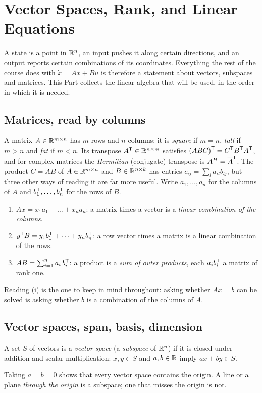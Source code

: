 \documentclass[11pt]{article}
\begin{document}


\section{Vector Spaces, Rank, and Linear Equations}\label{sec:vspace}

A state is a point in $\mathbb{R}^{n}$, an input pushes it along certain directions, and an
output reports certain combinations of its coordinates. Everything the rest of the
course does with $\dot x=Ax+Bu$ is therefore a statement about vectors, subspaces
and matrices. This Part collects the linear algebra that will be used, in the
order in which it is needed.

\subsection{Matrices, read by columns}
A matrix $A\in\mathbb{R}^{m\times n}$ has $m$ rows and $n$ columns; it is \emph{square} if
$m=n$, \emph{tall} if $m>n$ and \emph{fat} if $m<n$. Its transpose $A^{\mathsf{T}}\in\mathbb{R}^{n\times m}$
satisfies $(ABC)^{\mathsf{T}}=C^{\mathsf{T}} B^{\mathsf{T}} A^{\mathsf{T}}$, and for complex matrices the
\emph{Hermitian} (conjugate) transpose is $A^{H}=\overline{A}^{\mathsf{T}}$. The product
$C=AB$ of $A\in\mathbb{R}^{m\times n}$ and $B\in\mathbb{R}^{n\times k}$ has entries
$c_{ij}=\sum_{l}a_{il}b_{lj}$, but three other ways of reading it are far more
useful. Write $a_1,\dots,a_n$ for the columns of $A$ and $b_1^{\mathsf{T}},\dots,b_n^{\mathsf{T}}$ for
the rows of $B$.
\begin{enumerate}[label=(\roman*),itemsep=2pt]
\item $Ax = x_1a_1+\dots+x_na_n$: a matrix times a vector is a
\emph{linear combination of the columns}.
\item $y^{\mathsf{T}} B = y_1b_1^{\mathsf{T}}+\dots+y_nb_n^{\mathsf{T}}$: a row vector times a matrix is a linear
combination of the rows.
\item $AB = \sum_{i=1}^{n} a_i\,b_i^{\mathsf{T}}$: a product is a \emph{sum of outer products},
each $a_ib_i^{\mathsf{T}}$ a matrix of rank one.
\end{enumerate}
Reading (i) is the one to keep in mind throughout: asking whether $Ax=b$ can be
solved is asking whether $b$ is a combination of the columns of $A$.

\subsection{Vector spaces, span, basis, dimension}
\begin{definition}
A set $S$ of vectors is a \emph{vector space} (a \emph{subspace} of $\mathbb{R}^{n}$) if
it is closed under addition and scalar multiplication: $x,y\in S$ and
$a,b\in\mathbb{R}$ imply $ax+by\in S$.
\end{definition}
Taking $a=b=0$ shows that every vector space contains the origin. A line or a plane
\emph{through the origin} is a subspace; one that misses the origin is not.
\end{document}
